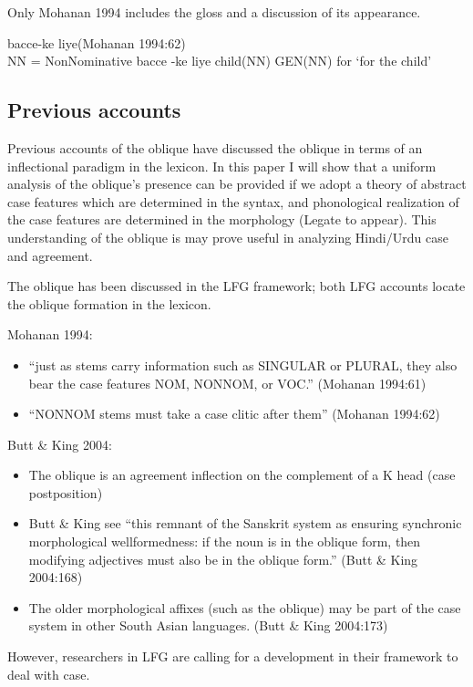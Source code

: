 \documentclass{article}
\begin{document}
Only Mohanan 1994 includes the gloss and a discussion of its appearance.

\begin{example}bacce-ke liye(Mohanan 1994:62)\\
NN = NonNominative
\gll bacce -ke liye
child(NN) GEN(NN) for
\glt `for the child'
\glend
\end{example}

\subsection{Previous accounts}

Previous accounts of the oblique have discussed the oblique in terms of an inflectional paradigm in the lexicon. In this paper I will show that a uniform analysis of the oblique's presence can be provided if we adopt a theory of abstract case features which are determined in the syntax, and phonological realization of the case features are determined in the morphology (Legate to appear). This understanding of the oblique is may prove useful in analyzing Hindi/Urdu case and agreement.

The oblique has been discussed in the LFG framework; both LFG accounts locate the oblique formation in the lexicon.

\begin{example}Mohanan 1994:\\
\begin{itemize}
\item ``just as stems carry information such as SINGULAR or PLURAL, they also bear the case features NOM, NONNOM, or VOC.” (Mohanan 1994:61)
\item ``NONNOM stems must take a case clitic after them” (Mohanan 1994:62)
\end{itemize}
\end{example}

\begin{example}Butt \& King 2004:\\
\begin{itemize}
\item The oblique is an agreement inflection on the complement of a K head (case postposition)
\item Butt \& King see ``this remnant of the Sanskrit system as ensuring synchronic morphological wellformedness: if the noun is in the oblique form, then modifying adjectives must also be in the oblique form.” (Butt \& King 2004:168)
\item The older morphological affixes (such as the oblique) may be part of the case system in other South Asian languages. (Butt \& King 2004:173)
\end{itemize}
\end{example}
However, researchers in LFG are calling for a development in their framework to deal with case.
\end{document}
